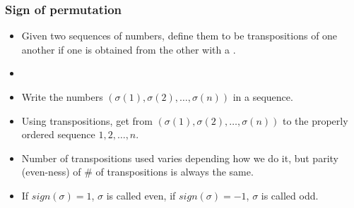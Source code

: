 \begin{frame}
\frametitle{Sign of permutation}
\begin{itemize}
\item Given two sequences of numbers, define them to be transpositions of one another if one is obtained from the other with a .
\item<2->  

 
\item<6-> Write the numbers $\left(\sigma(1),\sigma(2), \dots, \sigma(n)\right)$ in a sequence.
\item<7-> Using transpositions, get from $\left(\sigma(1),\sigma(2), \dots, \sigma(n)\right)$ to the properly ordered sequence $1,2,\dots, n$.
\item<8-> Number of transpositions used varies depending how we do it, but parity (even-ness) of \# of transpositions is always the same.
\item<10-> If $sign(\sigma)=1$,  $\sigma$ is called even, if $sign(\sigma)=-1$, $\sigma$ is called odd.
\end{itemize}
\end{frame}
